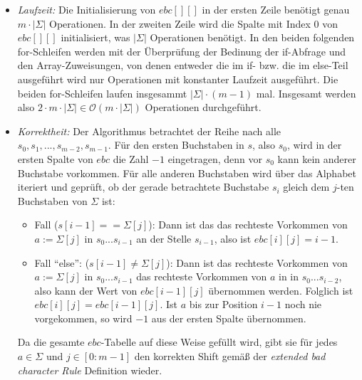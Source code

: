 \documentclass[a4paper,10pt,oneside,leqno]{scrartcl}
\begin{document}
\begin{itemize}
 \item \textit{Laufzeit:} Die Initialisierung von $ebc[][]$ in der ersten Zeile benötigt genau $m\cdot |\Sigma|$ Operationen. In der zweiten Zeile
 wird die Spalte mit Index 0 von $ebc[][]$ initialisiert, was $|\Sigma|$ Operationen benötigt. In den beiden folgenden for-Schleifen werden
 mit der Überprüfung der Bedinung der if-Abfrage und den Array-Zuweisungen, von denen entweder die im if- bzw. die im else-Teil ausgeführt
 wird nur Operationen mit konstanter Laufzeit ausgeführt. Die beiden for-Schleifen laufen insgesammt $|\Sigma| \cdot (m-1)$ mal. Insgesamt
 werden also $2\cdot m\cdot |\Sigma|\in \mathcal{O}(m\cdot |\Sigma|)$ Operationen durchgeführt.
 \item \textit{Korrektheit:} Der Algorithmus betrachtet der Reihe nach alle $s_0,s_1,...,s_{m-2},s_{m-1}$. Für den ersten Buchstaben in $s$,
 also $s_0$, wird in der ersten Spalte von $ebc$ die Zahl $-1$ eingetragen, denn vor $s_0$ kann kein anderer Buchstabe vorkommen.
 Für alle anderen Buchstaben wird über das Alphabet iteriert und geprüft, ob der gerade betrachtete Buchstabe $s_i$ gleich dem $j$-ten Buchstaben
 von $\Sigma$ ist:
  \begin{itemize}
   \item Fall ($s[i-1]==\Sigma[j]$): Dann ist das das rechteste Vorkommen von $a:=\Sigma[j]$ in $s_0...s_{i-1}$ an der Stelle $s_{i-1}$, also ist
   $ebc[i][j] = i-1$.
   \item Fall ``else'': ($s[i-1]\neq \Sigma[j]$): Dann ist das rechteste Vorkommen von $a:=\Sigma[j]$ in $s_0...s_{i-1}$ das rechteste Vorkommen
   von $a$ in in $s_0...s_{i-2}$, also kann der Wert von $ebc[i-1][j]$ übernommen werden. Folglich ist $ebc[i][j] = ebc[i-1][j]$. Ist $a$ bis zur
   Position $i-1$ noch nie vorgekommen, so wird $-1$ aus der ersten Spalte übernommen.
  \end{itemize}
  Da die gesamte $ebc$-Tabelle auf diese Weise gefüllt wird, gibt sie für jedes $a\in \Sigma$ und $j\in [0:m-1]$ den korrekten Shift gemäß der
  \textit{extended bad character Rule} Definition wieder.
\end{itemize}
\end{document}
